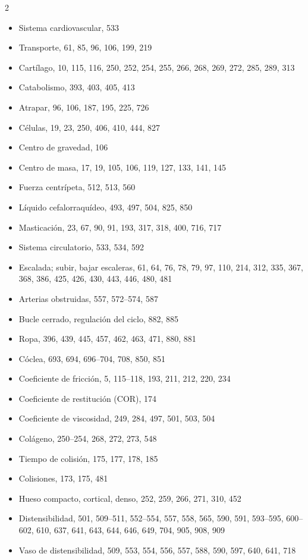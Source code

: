 \documentclass[12pt,a4paper]{book}
\begin{document}
\begin{multicols}{2}
\begin{itemize}[leftmargin=*]
  \item Sistema cardiovascular, 533
  \item Transporte, 61, 85, 96, 106, 199, 219
  \item Cartílago, 10, 115, 116, 250, 252, 254, 255, 266, 268, 269, 272, 285, 289, 313
  \item Catabolismo, 393, 403, 405, 413
  \item Atrapar, 96, 106, 187, 195, 225, 726
  \item Células, 19, 23, 250, 406, 410, 444, 827
  \item Centro de gravedad, 106
  \item Centro de masa, 17, 19, 105, 106, 119, 127, 133, 141, 145
  \item Fuerza centrípeta, 512, 513, 560
  \item Líquido cefalorraquídeo, 493, 497, 504, 825, 850
  \item Masticación, 23, 67, 90, 91, 193, 317, 318, 400, 716, 717
  \item Sistema circulatorio, 533, 534, 592
  \item Escalada; subir, bajar escaleras, 61, 64, 76, 78, 79, 97, 110, 214, 312, 335, 367, 368, 386, 425, 426, 430, 443, 446, 480, 481
  \item Arterias obstruidas, 557, 572--574, 587
  \item Bucle cerrado, regulación del ciclo, 882, 885
  \item Ropa, 396, 439, 445, 457, 462, 463, 471, 880, 881
  \item Cóclea, 693, 694, 696--704, 708, 850, 851
  \item Coeficiente de fricción, 5, 115--118, 193, 211, 212, 220, 234
  \item Coeficiente de restitución (COR), 174
  \item Coeficiente de viscosidad, 249, 284, 497, 501, 503, 504
  \item Colágeno, 250--254, 268, 272, 273, 548
  \item Tiempo de colisión, 175, 177, 178, 185
  \item Colisiones, 173, 175, 481
  \item Hueso compacto, cortical, denso, 252, 259, 266, 271, 310, 452
  \item Distensibilidad, 501, 509--511, 552--554, 557, 558, 565, 590, 591, 593--595, 600-- 602, 610, 637, 641, 643, 644, 646, 649, 704, 905, 908, 909
  \item Vaso de distensibilidad, 509, 553, 554, 556, 557, 588, 590, 597, 640, 641, 718

\end{itemize}
\end{multicols}
\end{document}
